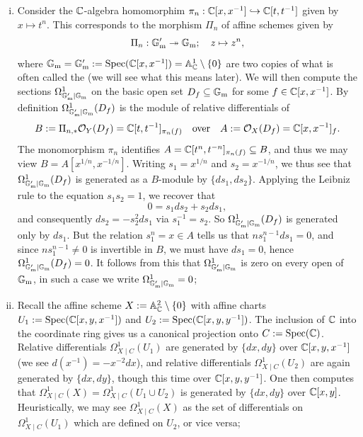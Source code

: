 \begin{eg}
	\label{eg:kahler_differentials_schemes}
	\begin{enumerate}[(i)]
		\item Consider the $\mathbb{C}$-algebra homomorphim $\pi_n : \mathbb{C}[x,x^{-1}] \hookrightarrow \mathbb{C}[t,t^{-1}]$ given by $x \mapsto t^n$. This corresponds to the morphism $\Pi_n$ of affine schemes given by 
			\[
				\Pi_n : \mathbb{G}_{\mathrm{m}}' \twoheadrightarrow \mathbb{G}_{\mathrm{m}}; \quad z \mapsto z^n,
			\]
		where $\mathbb{G}_{\mathrm{m}} = \mathbb{G}_{\mathrm{m}}':= \mathrm{Spec}(\mathbb{C}[x,x^{-1}]) = \mathbb{A}^1_{\mathbb{C}} \setminus \{0\}$  are two copies of what is often called the  (we will see what this means later). We will then compute the sections $\Omega^1_{\mathbb{G}_{\mathrm{m}}' \mid \mathbb{G}_{\mathrm{m}}}$ on the basic open set $D_f \subseteq \mathbb{G}_{\mathrm{m}}$ for some $f \in \mathbb{C}[x,x^{-1}]$. By definition $\Omega^1_{\mathbb{G}_{\mathrm{m}}' \mid \mathbb{G}_{\mathrm{m}}}(D_f)$ is the module of relative differentials of 
		\[
			B:=\Pi_{n, *}\mathcal{O}_Y(D_f) = \mathbb{C}[t,t^{-1}]_{\pi_n (f)} \quad \text{over} \quad A:=\mathcal{O}_X(D_f) = \mathbb{C}[x,x^{-1}]_f.
		\]
		The monomorphism $\pi_n$ identifies $A = \mathbb{C}[t^n, t^{-n}]_{\pi_n(f)} \subseteq B$, and thus we may view $B = A[x^{1 / n}, x^{-1 / n}]$. Writing $s_1 = x^{1/n}$ and $s_2 = x^{-1/n}$, we thus see that $\Omega^1_{\mathbb{G}_{\mathrm{m}}'\mid\mathbb{G}_{\mathrm{m}}}(D_f)$ is generated as a $B$-module by $\{ds_1, ds_2\}$. Applying the Leibniz rule to the equation $s_1 s_2 = 1$, we recover that 
		\[
			0 = s_1 ds_2 + s_2 ds_1,
		\]
		and consequently $ds_2 = -s_2^2 ds_1$ via $s_1^{-1} = s_2$. So $\Omega^1_{\mathbb{G}_{\mathrm{m}}' \mid \mathbb{G}_{\mathrm{m}}}(D_f)$ is generated only by $ds_1$. But the relation $s_1^n = x \in A$ tells us that $ns_1^{n-1} ds_1 = 0$, and since $ns_1^{n-1} \neq 0$ is invertible in $B$, we must have $ds_1 = 0$, hence $\Omega^1_{\mathbb{G}_{\mathrm{m}}' \mid \mathbb{G}_{\mathrm{m}}}(D_f)=0$. It follows from this that $\Omega^1_{\mathbb{G}_{\mathrm{m}}' \mid \mathbb{G}_{\mathrm{m}}}$ is zero on every open of $\mathbb{G}_{\mathrm{m}}$, in such a case we write $\Omega^1_{\mathbb{G}_{\mathrm{m}}' \mid \mathbb{G}_{\mathrm{m}}}=0$;
		\item Recall the affine scheme $X:=\mathbb{A}^2_{\mathbb{C}} \setminus \{0\}$ with affine charts $U_1 := \mathrm{Spec}(\mathbb{C}[x, y, x^{-1}])$ and $U_2 := \mathrm{Spec}(\mathbb{C}[x, y, y^{-1}])$. The inclusion of $\mathbb{C}$ into the coordinate ring gives us a canonical projection onto $C := \mathrm{Spec}(\mathbb{C})$. Relative differentials $\Omega^1_{X \mid C}(U_1)$ are generated by $\{dx, dy\}$ over $\mathbb{C}[x,y,x^{-1}]$ (we see $d(x^{-1}) = -x^{-2} dx$), and relative differentials $\Omega^1_{X \mid C}(U_2)$ are again generated by $\{dx, dy\}$, though this time over $\mathbb{C}[x,y,y^{-1}]$. One then computes that $\Omega^1_{X \mid C}(X) = \Omega^1_{X \mid C}(U_1 \cup U_2)$ is generated by $\{dx, dy\}$ over $\mathbb{C}[x,y]$. Heuristically, we may see $\Omega^1_{X \mid C}(X)$ as the set of differentials on $\Omega^1_{X \mid C}(U_1)$ which are defined on $U_2$, or vice versa;

\end{enumerate}
\end{eg}
